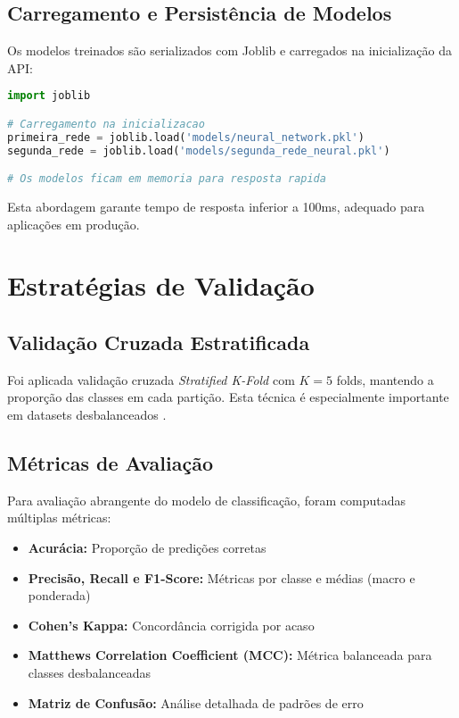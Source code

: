 \subsection{Carregamento e Persistência de Modelos}

Os modelos treinados são serializados com Joblib e carregados na inicialização da API:

\begin{lstlisting}[language=Python, caption=Carregamento de modelos, label=lst:load_models]
import joblib

# Carregamento na inicializacao
primeira_rede = joblib.load('models/neural_network.pkl')
segunda_rede = joblib.load('models/segunda_rede_neural.pkl')

# Os modelos ficam em memoria para resposta rapida
\end{lstlisting}

Esta abordagem garante tempo de resposta inferior a 100ms, adequado para aplicações em produção.

\section{Estratégias de Validação}

\subsection{Validação Cruzada Estratificada}

Foi aplicada validação cruzada \textit{Stratified K-Fold} com $K=5$ folds, mantendo a proporção das classes em cada partição. Esta técnica é especialmente importante em datasets desbalanceados \cite{kohavi1995study}.

\subsection{Métricas de Avaliação}

Para avaliação abrangente do modelo de classificação, foram computadas múltiplas métricas:

\begin{itemize}
    \item \textbf{Acurácia:} Proporção de predições corretas
    \item \textbf{Precisão, Recall e F1-Score:} Métricas por classe e médias (macro e ponderada)
    \item \textbf{Cohen's Kappa:} Concordância corrigida por acaso
    \item \textbf{Matthews Correlation Coefficient (MCC):} Métrica balanceada para classes desbalanceadas
    \item \textbf{Matriz de Confusão:} Análise detalhada de padrões de erro
\end{itemize}

